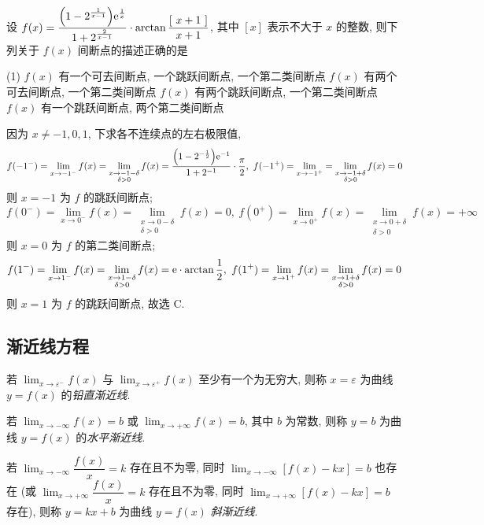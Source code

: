 \begin{example}
    设 $f(x)=\dfrac{\qty(1-2^{\frac{1}{x-1}})\mathrm{e}^{\frac{1}{x}}}{1+2^{\frac{2}{x-1}}}\cdot\arctan\dfrac{[~x+1~]}{x+1}$, 其中 $[x]$ 表示不大于 $x$ 的整数, 则下列关于 $f(x)$ 间断点的描述正确的是
    \begin{tasks}(1)
        \task $f(x)$ 有一个可去间断点, 一个跳跃间断点, 一个第二类间断点
        \task $f(x)$ 有两个可去间断点, 一个第二类间断点
        \task $f(x)$ 有两个跳跃间断点, 一个第二类间断点
        \task $f(x)$ 有一个跳跃间断点, 两个第二类间断点
    \end{tasks}
\end{example}
\begin{solution}
    因为 $x\neq-1,0,1$, 下求各不连续点的左右极限值,
    $$f(-1^-)=\lim_{x\to-1^-}f(x)=\lim_{\substack{x\to-1-\delta\\\delta>0}}f(x)=\dfrac{\qty(1-2^{-\frac{1}{2}})\mathrm{e}^{-1}}{1+2^{-1}}\cdot\dfrac{\pi}{2},~f(-1^+)=\lim_{x\to-1^+}=\lim_{\substack{x\to-1+\delta\\\delta>0}}f(x)=0$$
    则 $x=-1$ 为 $f$ 的跳跃间断点;
    $$f(0^-)=\lim_{x\to0^-}f(x)=\lim_{\substack{x\to0-\delta\\\delta>0}}f(x)=0,~f(0^+)=\lim_{x\to0^+}f(x)=\lim_{\substack{x\to0+\delta\\\delta>0}}f(x)=+\infty$$
    则 $x=0$ 为 $f$ 的第二类间断点;
    $$f(1^-)=\lim_{x\to1^-}f(x)=\lim_{\substack{x\to1-\delta\\\delta>0}}f(x)=\mathrm{e}\cdot\arctan\dfrac{1}{2},~f(1^+)=\lim_{x\to1^+}f(x)=\lim_{\substack{x\to1+\delta\\\delta>0}}f(x)=0$$
    则 $x=1$ 为 $f$ 的跳跃间断点, 故选 C.
\end{solution}

\subsection{渐近线方程}

\begin{definition}[铅直渐近线]
    若 $\displaystyle\lim_{x\to\varepsilon^-}f(x)$ 与 $\displaystyle \lim_{x\to\varepsilon^+}f(x)$ 至少有一个为无穷大, 则称 $x=\varepsilon$ 为曲线 $y=f(x)$ 的\textit{铅直渐近线}.
\end{definition}
\begin{definition}[水平渐近线]
    若 $\displaystyle\lim_{x\to-\infty}f(x)=b$ 或 $\displaystyle\lim_{x\to+\infty}f(x)=b$, 其中 $b$ 为常数, 则称 $y=b$ 为曲线 $y=f(x)$ 的\textit{水平渐近线}.
\end{definition}
\begin{definition}[斜渐近线]
    若 $\displaystyle\lim_{x\to-\infty}\dfrac{f(x)}{x}=k$ 存在且不为零, 同时 $\displaystyle\lim_{x\to-\infty}[f(x)-kx]=b$ 也存在 (或 $\displaystyle\lim_{x\to+\infty}\dfrac{f(x)}{x}=k$ 存在且不为零, 同时 $\displaystyle\lim_{x\to+\infty}[f(x)-kx]=b$ 存在),
    则称 $y=kx+b$ 为曲线 $y=f(x)$ \textit{斜渐近线}.
\end{definition}

